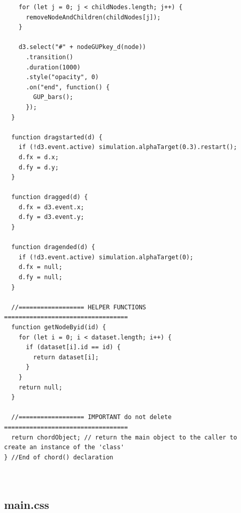 \documentclass[a4paper, 11pt]{article}
\begin{document}
\begin{verbatim}
    for (let j = 0; j < childNodes.length; j++) {
      removeNodeAndChildren(childNodes[j]);
    }

    d3.select("#" + nodeGUPkey_d(node))
      .transition()
      .duration(1000)
      .style("opacity", 0)
      .on("end", function() {
        GUP_bars();
      });
  }

  function dragstarted(d) {
    if (!d3.event.active) simulation.alphaTarget(0.3).restart();
    d.fx = d.x;
    d.fy = d.y;
  }

  function dragged(d) {
    d.fx = d3.event.x;
    d.fy = d3.event.y;
  }

  function dragended(d) {
    if (!d3.event.active) simulation.alphaTarget(0);
    d.fx = null;
    d.fy = null;
  }

  //================== HELPER FUNCTIONS ==================================
  function getNodeByid(id) {
    for (let i = 0; i < dataset.length; i++) {
      if (dataset[i].id == id) {
        return dataset[i];
      }
    }
    return null;
  }

  //================== IMPORTANT do not delete ==================================
  return chordObject; // return the main object to the caller to create an instance of the 'class'
} //End of chord() declaration

    
\end{verbatim}


\newpage
\subsection{main.css}
\end{document}
